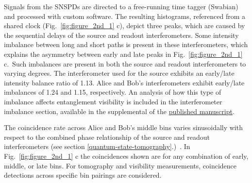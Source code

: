 \documentclass[11pt]{caltech_thesis} %
\begin{document}
Signals from the SNSPDs are directed to a free-running time tagger (Swabian) and processed with custom software. The resulting histograms, referenced from a shared clock (Fig.~\ref{fig:figure_2nd_1} c), depict three peaks, which are caused by the sequential delays of the source and readout interferometers. Some intensity imbalance between long and short paths is present in these interferometers, which explains the asymmetry between early and late peaks in Fig.~\ref{fig:figure_2nd_1} c.~Such imbalances are present in both the source and readout interferometers to varying degrees. The interferometer used for the source exhibits an early/late intensity balance ratio of 1.13. Alice and Bob's interferometers exhibit early/late imbalances of 1.24 and 1.15, respectively. An analysis of how this type of imbalance affects entanglement visibility is included in the interferometer imbalance section, available in the supplemental of the \href{https://arxiv.org/abs/2310.01804}{published manuscript}.

The coincidence rate across Alice and Bob's middle bins varies sinusoidally with respect to the combined phase relationship of the source and readout interferometers (see section \ref{quantum-state-tomography}.)~\autocite{Inagaki2013,Marcikic2002}. In Fig.~\ref{fig:figure_2nd_1} c the coincidences shown are for any combination of early, middle, or late bins. For tomography and visibility measurements, coincidence detections across specific bin pairings are considered.
\end{document}

